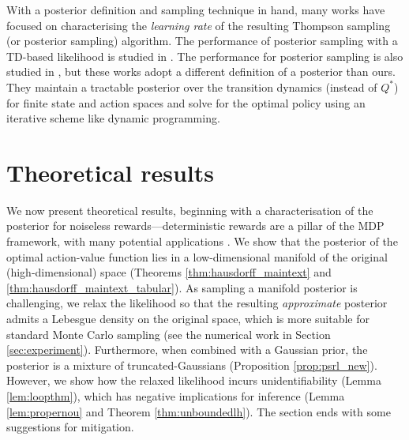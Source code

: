 \documentclass{amsart}
\begin{document}
With a posterior definition and sampling technique in hand, many works have focused on characterising the {\it learning rate} of the resulting Thompson sampling (or posterior sampling) algorithm. The performance of posterior sampling with a TD-based likelihood is studied in \citet{rlsvi_regret_russo,provablyefficientpossampling}. The performance for posterior sampling is also studied in \citet{psrl_modelbased_regret_agrawal,whypsrlbetterthanoptimism, psrl-ssp}, but 
these works adopt a different definition of a posterior than ours. They maintain a tractable posterior over the transition dynamics (instead of $Q^*$) for finite state and action spaces and solve for the optimal policy using an iterative scheme like dynamic programming.







\section{Theoretical results}
\label{sec:theory}

We now present theoretical results, beginning with a characterisation of the posterior for noiseless rewards---deterministic rewards are a pillar of the MDP framework, with many potential applications \citep{putermanrl,bertsekas2012}. We show that the posterior of the optimal action-value function lies in a low-dimensional manifold of the original (high-dimensional) space (Theorems \ref{thm:hausdorff_maintext} and \ref{thm:hausdorff_maintext_tabular}). As sampling a manifold posterior is challenging, we relax the likelihood so that the resulting \textit{approximate} posterior admits a Lebesgue density on the original space, which is more suitable for standard Monte Carlo sampling (see the numerical work in Section \ref{sec:experiment}). Furthermore, when combined with a Gaussian prior, the posterior is a mixture of truncated-Gaussians (Proposition \ref{prop:psrl_new}). However, we show how the relaxed likelihood incurs unidentifiability (Lemma \ref{lem:loopthm}), which has negative implications for inference (Lemma \ref{lem:propernou} and Theorem \ref{thm:unboundedlh}). The section ends with some suggestions for mitigation.
\end{document}
